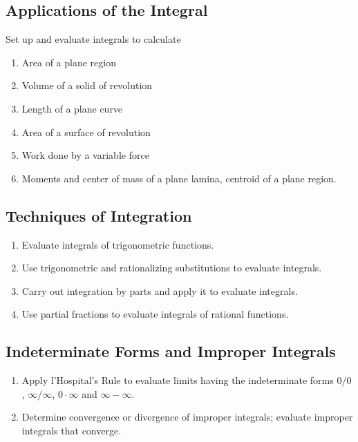 \documentclass[11pt]{article}
\begin{document}
\subsection{Applications of the Integral} 
Set up and evaluate integrals to calculate
  \begin{enumerate}
    \item Area of a plane region
    \item Volume of a solid of revolution
    \item Length of a plane curve
    \item Area of a surface of revolution
    \item Work done by a variable force
    \item Moments and center of mass of a plane lamina, centroid of a plane
          region. 
  \end{enumerate}
\subsection{Techniques of Integration}
  \begin{enumerate}
    \item Evaluate integrals of trigonometric functions.
    \item Use trigonometric and rationalizing substitutions to evaluate
          integrals. 
    \item Carry out integration by parts and apply it to evaluate integrals.
    \item Use partial fractions to evaluate integrals of rational functions.
  \end{enumerate}
\subsection{Indeterminate Forms and Improper Integrals}
  \begin{enumerate}
    \item Apply l'Hospital's Rule to evaluate limits having the
          indeterminate forms $0/0$, $\infty/\infty$, $0\cdot\infty$ and
          $\infty-\infty$. 
    \item Determine convergence or divergence of improper integrals; evaluate
          improper integrals that converge.
  \end{enumerate}
\end{document}
